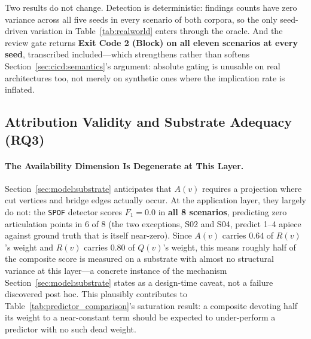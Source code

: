 Two results do not change. Detection is deterministic: findings counts have zero variance across
all five seeds in every scenario of both corpora, so the only seed-driven variation in
Table~\ref{tab:realworld} enters through the oracle. And the review gate returns \textbf{Exit Code
2 (Block) on all eleven scenarios at every seed}, transcribed included---which strengthens rather
than softens Section~\ref{sec:cicd:semantics}'s argument: absolute gating is unusable on real
architectures too, not merely on synthetic ones where the implication rate is inflated.

\subsection{Attribution Validity and Substrate Adequacy (RQ3)}
\label{sec:results:attribution}

\paragraph{The Availability Dimension Is Degenerate at This Layer.} Section~\ref{sec:model:substrate} anticipates that $A(v)$ requires a projection where cut vertices and bridge edges actually occur. At the application layer, they largely do not: the \texttt{SPOF} detector scores $F_1 = 0.0$ in \textbf{all 8 scenarios}, predicting zero articulation points in 6 of 8 (the two exceptions, S02 and S04, predict 1--4 apiece against ground truth that is itself near-zero). Since $A(v)$ carries $0.64$ of $R(v)$'s weight and $R(v)$ carries $0.80$ of $Q(v)$'s weight, this means roughly half of the composite score is measured on a substrate with almost no structural variance at this layer---a concrete instance of the mechanism Section~\ref{sec:model:substrate} states as a design-time caveat, not a failure discovered post hoc. This plausibly contributes to Table~\ref{tab:predictor_comparison}'s saturation result: a composite devoting half its weight to a near-constant term should be expected to under-perform a predictor with no such dead weight.

